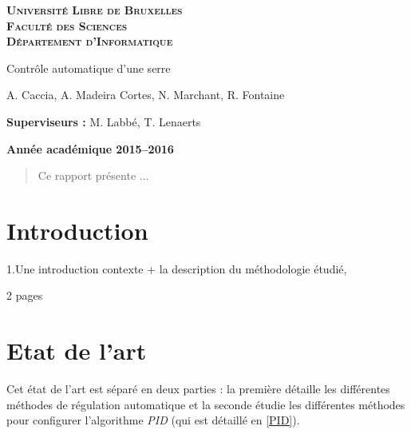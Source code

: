 \documentclass[a4paper,10pt]{report}
\begin{document}
\begin{titlepage}
    \begin{center}
        \textbf{\textsc{Université Libre de Bruxelles}}\\
        \textbf{\textsc{Faculté des Sciences}}\\
        \textbf{\textsc{Département d'Informatique}}

        \vfill{}
        \vfill{}

        \begin{center}
            {\Huge Contrôle automatique d'une serre}
        \end{center}

        {\Huge \par}

        \begin{center}
            {\large A. Caccia, A. Madeira Cortes, N. Marchant, R. Fontaine}
        \end{center}

        {\Huge \par}
        \vfill{}
        \vfill{}

        \begin{flushleft}
            {\large \textbf{Superviseurs :} M. Labbé, T. Lenaerts}
            \hfill{}
        \end{flushleft}

        {\large\par}
        \vfill{}
        \vfill{}

        \textbf{Année académique 2015--2016}
    \end{center}
\end{titlepage}

\begin{abstract}
Ce rapport présente ...
\end{abstract}


\tableofcontents


\chapter{Introduction}
1.Une introduction contexte + la description du méthodologie étudié,

2 pages

\chapter{Etat de l'art}
Cet état de l'art est séparé en deux parties : la première détaille les différentes méthodes de régulation automatique et la seconde étudie les différentes méthodes pour configurer l'algorithme \emph{PID} (qui est détaillé en \ref{PID}).
\end{document}
